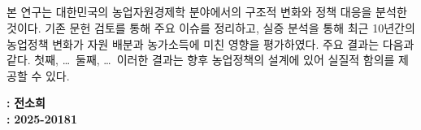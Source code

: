 
\begin{center}
\section*{}
\end{center}

\vspace{1cm}

본 연구는 대한민국의 농업자원경제학 분야에서의 구조적 변화와 정책 대응을 분석한 것이다.
기존 문헌 검토를 통해 주요 이슈를 정리하고, 실증 분석을 통해 최근 10년간의 농업정책 변화가 
자원 배분과 농가소득에 미친 영향을 평가하였다. 주요 결과는 다음과 같다. 첫째, \ldots\ 
둘째, \ldots\ 이러한 결과는 향후 농업정책의 설계에 있어 실질적 함의를 제공할 수 있다.


\noindent
{}
\textbf{:}
\textbf{전소희}\\
\textbf{:}
\textbf{2025-20181}\\
